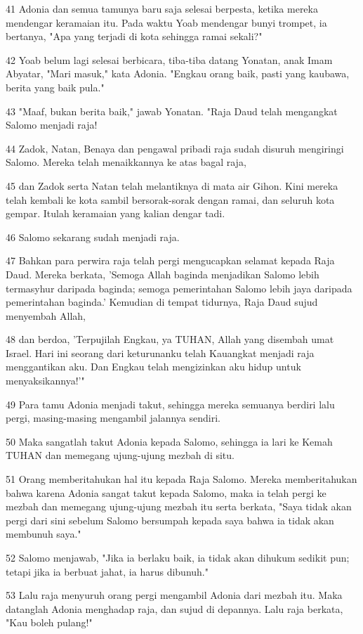 \par 41 Adonia dan semua tamunya baru saja selesai berpesta, ketika mereka mendengar keramaian itu. Pada waktu Yoab mendengar bunyi trompet, ia bertanya, "Apa yang terjadi di kota sehingga ramai sekali?"
\par 42 Yoab belum lagi selesai berbicara, tiba-tiba datang Yonatan, anak Imam Abyatar, "Mari masuk," kata Adonia. "Engkau orang baik, pasti yang kaubawa, berita yang baik pula."
\par 43 "Maaf, bukan berita baik," jawab Yonatan. "Raja Daud telah mengangkat Salomo menjadi raja!
\par 44 Zadok, Natan, Benaya dan pengawal pribadi raja sudah disuruh mengiringi Salomo. Mereka telah menaikkannya ke atas bagal raja,
\par 45 dan Zadok serta Natan telah melantiknya di mata air Gihon. Kini mereka telah kembali ke kota sambil bersorak-sorak dengan ramai, dan seluruh kota gempar. Itulah keramaian yang kalian dengar tadi.
\par 46 Salomo sekarang sudah menjadi raja.
\par 47 Bahkan para perwira raja telah pergi mengucapkan selamat kepada Raja Daud. Mereka berkata, 'Semoga Allah baginda menjadikan Salomo lebih termasyhur daripada baginda; semoga pemerintahan Salomo lebih jaya daripada pemerintahan baginda.' Kemudian di tempat tidurnya, Raja Daud sujud menyembah Allah,
\par 48 dan berdoa, 'Terpujilah Engkau, ya TUHAN, Allah yang disembah umat Israel. Hari ini seorang dari keturunanku telah Kauangkat menjadi raja menggantikan aku. Dan Engkau telah mengizinkan aku hidup untuk menyaksikannya!'"
\par 49 Para tamu Adonia menjadi takut, sehingga mereka semuanya berdiri lalu pergi, masing-masing mengambil jalannya sendiri.
\par 50 Maka sangatlah takut Adonia kepada Salomo, sehingga ia lari ke Kemah TUHAN dan memegang ujung-ujung mezbah di situ.
\par 51 Orang memberitahukan hal itu kepada Raja Salomo. Mereka memberitahukan bahwa karena Adonia sangat takut kepada Salomo, maka ia telah pergi ke mezbah dan memegang ujung-ujung mezbah itu serta berkata, "Saya tidak akan pergi dari sini sebelum Salomo bersumpah kepada saya bahwa ia tidak akan membunuh saya."
\par 52 Salomo menjawab, "Jika ia berlaku baik, ia tidak akan dihukum sedikit pun; tetapi jika ia berbuat jahat, ia harus dibunuh."
\par 53 Lalu raja menyuruh orang pergi mengambil Adonia dari mezbah itu. Maka datanglah Adonia menghadap raja, dan sujud di depannya. Lalu raja berkata, "Kau boleh pulang!"

